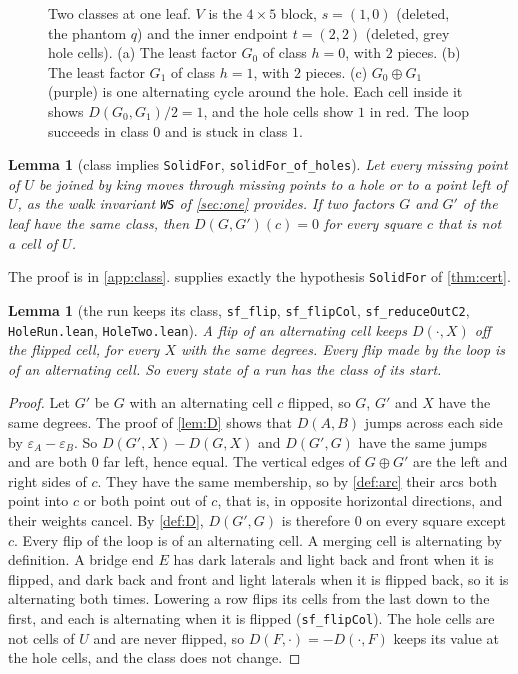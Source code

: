 \documentclass[11pt]{article}
\theoremstyle{plain}
\newtheorem{lemma}[theorem]{Lemma}
\theoremstyle{definition}
\theoremstyle{remark}
\newcommand{\lean}[1]{\texttt{#1}}
\begin{document}
\begin{figure}[t]
\centering

\caption{Two classes at one leaf.
$V$ is the $4\times5$ block, $s=(1,0)$ (deleted, the phantom $q$) and the inner endpoint $t=(2,2)$
(deleted, grey hole cells).
(a) The least factor $G_0$ of class $h=0$, with $2$ pieces.
(b) The least factor $G_1$ of class $h=1$, with $2$ pieces.
(c) $G_0\oplus G_1$ (purple) is one alternating cycle around the hole.
Each cell inside it shows $D(G_0,G_1)/2=1$, and the hole cells show $1$ in red.
The loop succeeds in class $0$ and is stuck in class $1$.}
\label{fig:classes}
\end{figure}

\begin{lemma}[class implies \lean{SolidFor}, \lean{solidFor\_of\_holes}]
\label{lem:classsolid}
Let every missing point of $U$ be joined by king moves through missing points to a hole or to a
point left of $U$, as the walk invariant \lean{WS} of \cref{sec:one} provides.
If two factors $G$ and $G'$ of the leaf have the same class, then $D(G,G')(c)=0$ for every square
$c$ that is not a cell of
$U$.
\end{lemma}

The proof is in \cref{app:class}.
 supplies exactly the hypothesis \lean{SolidFor} of \cref{thm:cert}.

\begin{lemma}[the run keeps its class, \lean{sf\_flip}, \lean{sf\_flipCol}, \lean{sf\_reduceOutC2}, \lean{HoleRun.lean}, \lean{HoleTwo.lean}]
\label{lem:runclass}
A flip of an alternating cell keeps $D(\cdot,X)$ off the flipped cell, for every $X$ with the same
degrees.
Every flip made by the loop is of an alternating cell.
So every state of a run has the class of its start.
\end{lemma}

\begin{proof}
Let $G'$ be $G$ with an alternating cell $c$ flipped, so $G$, $G'$ and $X$ have the same degrees.
The proof of \cref{lem:D} shows that $D(A,B)$ jumps across each side by
$\varepsilon_A-\varepsilon_B$.
So $D(G',X)-D(G,X)$ and $D(G',G)$ have the same jumps and are both $0$ far left, hence equal.
The vertical edges of $G\oplus G'$ are the left and right sides of $c$.
They have the same membership, so by \cref{def:arc} their arcs both point into $c$ or both point out
of $c$, that is, in opposite horizontal directions, and their weights cancel.
By \cref{def:D}, $D(G',G)$ is therefore $0$ on every square except $c$.
Every flip of the loop is of an alternating cell.
A merging cell is alternating by definition.
A bridge end $E$ has dark laterals and light back and front when it is flipped, and dark back and
front and light laterals when it is flipped back, so it is alternating both times.
Lowering a row flips its cells from the last down to the first, and each is alternating when it is
flipped (\lean{sf\_flipCol}).
The hole cells are not cells of $U$ and are never flipped, so $D(F,\cdot)=-D(\cdot,F)$ keeps its
value at the hole cells, and the class does not change.
\end{proof}
\end{document}
